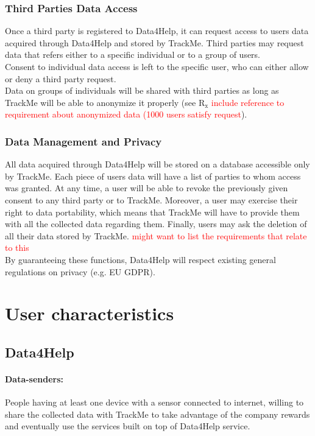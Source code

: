 \documentclass{report}
\newcommand\todo[1]{\textcolor{red}{#1}}
\newcommand{\subs}[1]{\ensuremath{_{\textrm{#1}}}}
\begin{document}
			\subsubsection{Third Parties Data Access}
			Once a third party is registered to Data4Help, it can request access to users data acquired through Data4Help and stored by TrackMe. Third parties may request data that refers either to a specific individual or to a group of users.\\
			Consent to individual data access is left to the specific user, who can either allow or deny a third party request.\\
			Data on groups of individuals will be shared with third parties as long as TrackMe will be able to anonymize it properly (see R\subs{x} \todo{include reference to requirement about anonymized data (1000 users satisfy request}).

			\subsubsection{Data Management and Privacy}
			All data acquired through Data4Help will be stored on a database accessible only by TrackMe. Each piece of users data will have a list of parties to whom access was granted. At any time, a user will be able to revoke the previously given consent to any third party or to TrackMe. Moreover, a user may exercise their right to data portability, which means that TrackMe will have to provide them with all the collected data regarding them. Finally, users may ask the deletion of all their data stored by TrackMe. \todo{might want to list the requirements that relate to this}\\
			By guaranteeing these functions, Data4Help will respect existing general regulations on privacy (e.g. EU GDPR). 
			
			
		\section{User characteristics}
			\subsection{Data4Help}
				\paragraph{Data-senders:}
				People having at least one device with a sensor connected to internet, willing to share the collected data with TrackMe to take advantage of the company rewards and eventually use the services built on top of Data4Help service.
\end{document}
